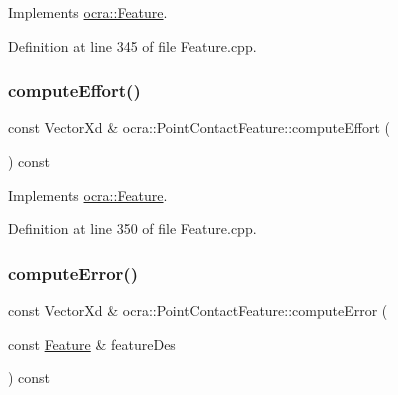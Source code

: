 Implements \hyperlink{classocra_1_1Feature_a19626a241666fdae253af1f7b6f2acd7}{ocra\+::\+Feature}.



Definition at line 345 of file Feature.\+cpp.

\hypertarget{classocra_1_1PointContactFeature_ad925987e17dcfa0f8157deff33b9d311}{}\label{classocra_1_1PointContactFeature_ad925987e17dcfa0f8157deff33b9d311} 
\subsubsection{\texorpdfstring{compute\+Effort()}{computeEffort()}\hspace{0.1cm}{\footnotesize\ttfamily [2/2]}}
{\footnotesize\ttfamily const Vector\+Xd \& ocra\+::\+Point\+Contact\+Feature\+::compute\+Effort (\begin{DoxyParamCaption}{ }\end{DoxyParamCaption}) const\hspace{0.3cm}{\ttfamily [virtual]}}



Implements \hyperlink{classocra_1_1Feature_ae43f2ffc54862d6ddc0b02fd39431eb6}{ocra\+::\+Feature}.



Definition at line 350 of file Feature.\+cpp.

\hypertarget{classocra_1_1PointContactFeature_a6d9c92bc50784f7ecd8dda683d32b7aa}{}\label{classocra_1_1PointContactFeature_a6d9c92bc50784f7ecd8dda683d32b7aa} 
\subsubsection{\texorpdfstring{compute\+Error()}{computeError()}\hspace{0.1cm}{\footnotesize\ttfamily [1/2]}}
{\footnotesize\ttfamily const Vector\+Xd \& ocra\+::\+Point\+Contact\+Feature\+::compute\+Error (\begin{DoxyParamCaption}\item[{const \hyperlink{classocra_1_1Feature}{Feature} \&}]{feature\+Des }\end{DoxyParamCaption}) const\hspace{0.3cm}{\ttfamily [virtual]}}




